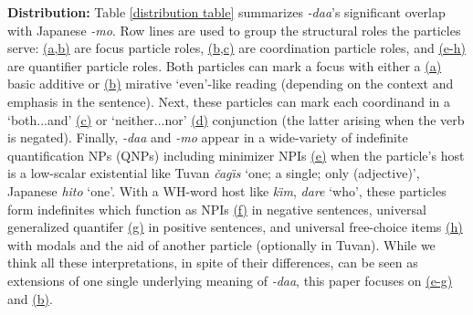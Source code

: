 \documentclass[11pt]{article}
\newcommand{\changis}{\v{c}a\textipa{N}g\"{\i}s}
\begin{document}
\noindent \textbf{Distribution: } Table \ref{distribution table} summarizes \textit{-daa}'s significant overlap with Japanese \textit{-mo}.  Row lines are used to group the structural roles the particles serve: \hyperref[distribution table]{(a,b)} are focus particle roles, \hyperref[distribution table]{(b,c)} are coordination particle roles, and \hyperref[distribution table]{(e-h)} are quantifier particle roles.  Both particles can mark a focus with either a \hyperref[distribution table]{(a)} basic additive or \hyperref[distribution table]{(b)} mirative `even'-like reading (depending on the context and emphasis in the sentence).  Next, these particles can mark each coordinand in a `both...and' \hyperref[distribution table]{(c)} or `neither...nor' \hyperref[distribution table]{(d)} conjunction (the latter arising when the verb is negated).  Finally, \textit{-daa} and \textit{-mo} appear in a wide-variety of indefinite quantification NPs (QNPs) including minimizer NPIs \hyperref[distribution table]{(e)} when the particle's host is a low-scalar existential like Tuvan \textit{\changis} `one; a single; only (adjective)', Japanese \textit{hito} `one'.  With a WH-word host like \textit{k\"{\i}m}, \textit{dare} `who', these particles form indefinites which function as NPIs \hyperref[distribution table]{(f)} in negative sentences, universal generalized quantifer \hyperref[distribution table]{(g)} in positive sentences, and universal free-choice items \hyperref[distribution table]{(h)} with modals and the aid of another particle (optionally in Tuvan).  While we think all these interpretations, in spite of their differences, can be seen as extensions of one single underlying meaning of \textit{-daa}, this paper focuses on \hyperref[distribution table]{(e-g)} and \hyperref[distribution table]{(b)}.




\end{document}
